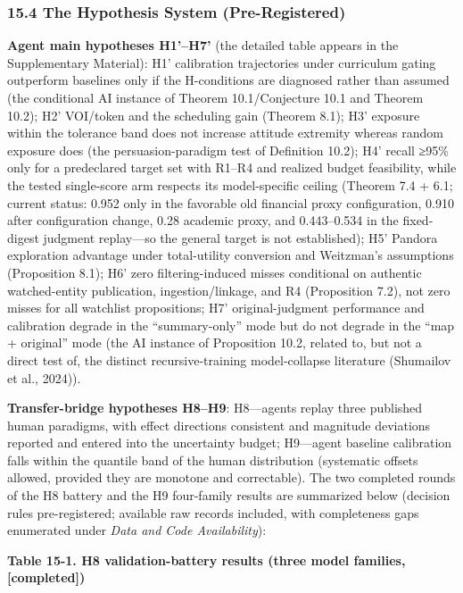 \documentclass[
  11pt]{article}
\begin{document}
\subsubsection{15.4 The Hypothesis System
(Pre-Registered)}\label{the-hypothesis-system-pre-registered}

\textbf{Agent main hypotheses H1'--H7'} (the detailed table appears in
the Supplementary Material): H1' calibration trajectories under
curriculum gating outperform baselines only if the H-conditions are
diagnosed rather than assumed (the conditional AI instance of Theorem
10.1/Conjecture 10.1 and Theorem 10.2); H2' VOI/token and the scheduling
gain (Theorem 8.1); H3' exposure within the tolerance band does not
increase attitude extremity whereas random exposure does (the
persuasion-paradigm test of Definition 10.2); H4' recall ≥95\% only for
a predeclared target set with R1--R4 and realized budget feasibility,
while the tested single-score arm respects its model-specific ceiling
(Theorem 7.4 + 6.1; current status: 0.952 only in the favorable old
financial proxy configuration, 0.910 after configuration change, 0.28
academic proxy, and 0.443--0.534 in the fixed-digest judgment
replay---so the general target is not established); H5' Pandora
exploration advantage under total-utility conversion and Weitzman's
assumptions (Proposition 8.1); H6' zero filtering-induced misses
conditional on authentic watched-entity publication, ingestion/linkage,
and R4 (Proposition 7.2), not zero misses for all watchlist
propositions; H7' original-judgment performance and calibration degrade
in the ``summary-only'' mode but do not degrade in the ``map +
original'' mode (the AI instance of Proposition 10.2, related to, but
not a direct test of, the distinct recursive-training model-collapse
literature (Shumailov et al., 2024)).

\textbf{Transfer-bridge hypotheses H8--H9}: H8---agents replay three
published human paradigms, with effect directions consistent and
magnitude deviations reported and entered into the uncertainty budget;
H9---agent baseline calibration falls within the quantile band of the
human distribution (systematic offsets allowed, provided they are
monotone and correctable). The two completed rounds of the H8 battery
and the H9 four-family results are summarized below (decision rules
pre-registered; available raw records included, with completeness gaps
enumerated under \emph{Data and Code Availability}):

\textbf{Table 15-1. H8 validation-battery results (three model families,
{[}completed{]})}
\end{document}
